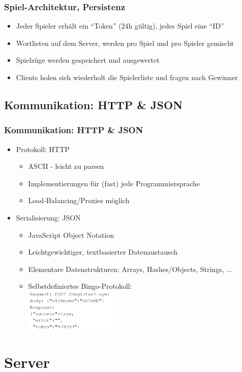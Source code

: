 \documentclass{beamer}
\begin{document}
\begin{frame}[fragile]
\frametitle{Spiel-Architektur, Persistenz}
\begin{itemize}
\item Jeder Spieler erhält ein "`Token"' (24h gültig), jedes Spiel eine "`ID"'
\item Wortlisten auf dem Server, werden pro Spiel und pro Spieler gemischt
\item Spielzüge werden gespeichert und ausgewertet
\item Clients holen sich wiederholt die Spielerliste und fragen nach Gewinner
\end{itemize}
\end{frame}


\subsection{Kommunikation: HTTP \& JSON}
\begin{frame}[fragile]
\frametitle{Kommunikation: HTTP \& JSON}
\begin{itemize}
\item Protokoll: HTTP
\begin{itemize}
\item ASCII - leicht zu parsen
\item Implementierungen für (fast) jede Programmiersprache
\item Load-Balancing/Proxies möglich
\end{itemize}
\item Serialisierung: JSON
\begin{itemize}
\item JavaScript Object Notation
\item Leichtgewichtiger, textbasierter Datenaustausch
\item Elementare Datenstrukturen: Arrays, Hashes/Objects, Strings, ...
\item Selbstdefiniertes Bingo-Protokoll: \\
\includegraphics[height=2cm]{protocol.png}
\end{itemize}
\end{itemize}
\end{frame}

\section{Server}
\end{document}
